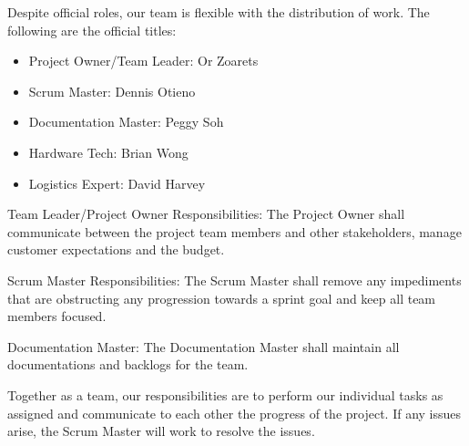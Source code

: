 Despite official roles, our team is flexible with the distribution of work. The following are the official titles:
\begin{itemize}
	\item Project Owner/Team Leader: Or Zoarets
	\item Scrum Master: Dennis Otieno
	\item Documentation Master: Peggy Soh
	\item Hardware Tech: Brian Wong
	\item Logistics Expert: David Harvey
\end{itemize}
Team Leader/Project Owner Responsibilities: The Project Owner shall communicate between the project team members and other stakeholders, manage customer expectations and the budget.

Scrum Master Responsibilities: The Scrum Master shall remove any impediments that are obstructing any progression towards a sprint goal and keep all team members focused.

Documentation Master: The Documentation Master shall maintain all documentations and backlogs for the team.

Together as a team, our responsibilities are to perform our individual tasks as assigned and communicate to each other the progress of the project. If any issues arise, the Scrum Master will work to resolve the issues. 
